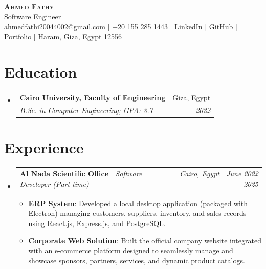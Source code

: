 \documentclass[letterpaper,11pt]{article}
\makeatletter
\newcommand{\resumeItem}[2]{\item\small{\textbf{#1}{: #2 \vspace{-2pt}}}}
\newcommand{\resumeSubheading}[4]{
  \vspace{-1pt}\item
    \begin{tabular*}{0.97\textwidth}{l@{\extracolsep{\fill}}r}
      \textbf{#1} & #2 \\
      \textit{\small#3} & \textit{\small #4} \\
    \end{tabular*}\vspace{-5pt}
}
\newcommand{\resumeActivitySubheading}[4]{
  \vspace{-1pt}\item
    \begin{tabular*}{0.97\textwidth}{l@{\extracolsep{\fill}}r}
      \textbf{#1} $|$ \textit{\small#3} & \textit{\small#2} $|$ \textit{\small #4} \\
    \end{tabular*}\vspace{-5pt}
}
\newcommand{\resumeSubHeadingListStart}{\begin{itemize}[leftmargin=*]}
\newcommand{\resumeSubHeadingListEnd}{\end{itemize}}
\newcommand{\resumeItemListStart}{\begin{itemize}}
\newcommand{\resumeItemListEnd}{\end{itemize}\vspace{-5pt}}
\newcommand{\resumeHeaderName}[1]{\Huge \scshape #1}
\newcommand{\resumeHeaderMeta}[1]{\small #1}
\makeatother
\begin{document}
\begin{center}
    \textbf{\resumeHeaderName{Ahmed Fathy}} \\ \vspace{1pt}
    \resumeHeaderMeta{Software Engineer} \\
    \href{mailto:ahmedfathi20044002@gmail.com}{\underline{ahmedfathi20044002@gmail.com}} $|$
    +20 155 285 1443 $|$
    \href{https://www.linkedin.com/in/ahmedfathy-x1}{\underline{LinkedIn}} $|$
    \href{https://github.com/ahmedfathy0-0}{\underline{GitHub}} $|$
    \href{https://www.mrfathi.tech/}{\underline{Portfolio}} $|$
    Haram, Giza, Egypt 12556
\end{center}


\section{Education}
  \resumeSubHeadingListStart
    \resumeSubheading
      {Cairo University, Faculty of Engineering}{Giza, Egypt}
      {B.Sc. in Computer Engineering;  GPA: 3.7}{2022}
  \resumeSubHeadingListEnd
\section{Experience}
  \resumeSubHeadingListStart
    \resumeActivitySubheading
      {Al Nada Scientific Office}{Cairo, Egypt}{Software Developer (Part-time)}{June 2022 -- 2025}
      \resumeItemListStart
        \resumeItem{ERP System}
          {Developed a local desktop application (packaged with Electron) managing customers, suppliers, inventory, and sales records using React.js, Express.js, and PostgreSQL.}
        \resumeItem{Corporate Web Solution}
          {Built the official company website integrated with an e-commerce platform designed to seamlessly manage and showcase sponsors, partners, services, and dynamic product catalogs.}
      \resumeItemListEnd
  \resumeSubHeadingListEnd
\end{document}
